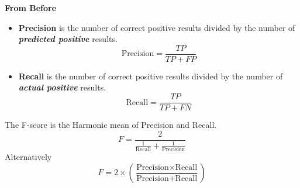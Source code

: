 \documentclass[]{report}
\begin{document}
\noindent \textbf{From Before}

\begin{itemize}
	\item \textbf{Precision} is the number of correct positive results divided by the number of \textit{\textbf{predicted positive}} results.
	\[ \mbox{Precision}= \frac{TP}{TP+FP}  \]
	\item \textbf{Recall} is the number of correct positive results divided by the number of \textit{\textbf{actual positive}} results. 
	\[ \mbox{Recall}= \frac{TP}{TP+FN}  \]
\end{itemize}



The F-score is the Harmonic mean of Precision and Recall.
\[ F = \frac{2}{\frac{1}{\mbox{Recall}} + \frac{1}{\mbox{Precision}}} \]
Alternatively
\[ F = 2 \times \left( \frac{\mbox{Precision} \times \mbox{Recall}}{\mbox{Precision} + \mbox{Recall}} \right) \] 


\end{document}
